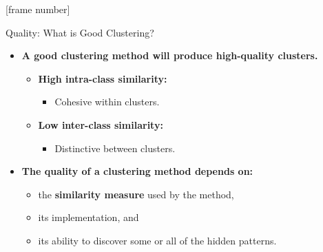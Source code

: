 \documentclass[aspectratio=169,t,xcolor=dvipsnames]{beamer}
\begin{document}
  {
    [frame number]
    \begin{frame}{Quality: What is Good Clustering?}
        \begin{itemize}
          \item \textbf{A good clustering method will produce high-quality clusters.}
          \begin{itemize}
            \item \textbf{\color{airforceblue}High intra-class similarity:}
            \begin{itemize}
              \item Cohesive within clusters.
            \end{itemize}
            \item \textbf{\color{airforceblue}Low inter-class similarity:}
            \begin{itemize}
              \item Distinctive between clusters.
            \end{itemize}
          \end{itemize}
          \item \textbf{The {\color{airforceblue}quality} of a clustering method depends on:}
          \begin{itemize}
            \item the \textbf{\color{airforceblue}similarity measure} used by the method,
            \item its implementation, and
            \item its ability to discover some or all of the hidden patterns.
          \end{itemize}
        \end{itemize}
    \end{frame}
  }
\end{document}
